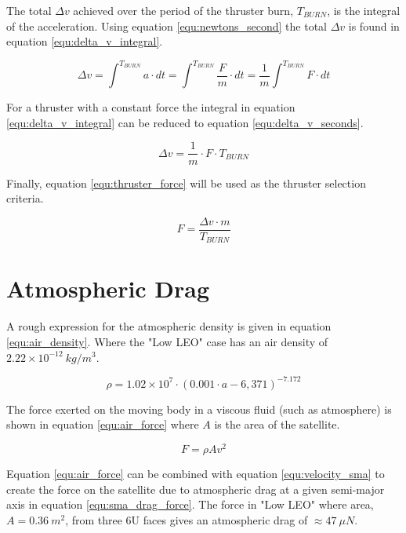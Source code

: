 \documentclass[a4paper, article, oneside, UKenglish]{memoir}
\newcommand{\0}{\mathbf{0}}
\newcommand{\1}{\mathbf{1}}
\begin{document}
The total $ \Delta v $ achieved over the period of the thruster burn, $T_{BURN}$, is the integral of the acceleration.  Using equation \ref{equ:newtons_second} the total $ \Delta v $ is found in equation \ref{equ:delta_v_integral}.

\begin{equation}
\Delta v = \int^{T_{BURN}} a \cdot dt = \int^{T_{BURN}} \frac{F}{m} \cdot dt = \frac{1}{m} \int^{T_{BURN}} F \cdot dt
\label{equ:delta_v_integral}
\end{equation}

For a thruster with a constant force the integral in equation \ref{equ:delta_v_integral} can be reduced to equation \ref{equ:delta_v_seconds}.

\begin{equation}
\Delta v =  \frac{1}{m} \cdot F \cdot T_{BURN}
\label{equ:delta_v_seconds}
\end{equation}

Finally, equation \ref{equ:thruster_force} will be used as the thruster selection criteria. 

\begin{equation}
F = \frac{\Delta v \cdot m}{T_{BURN}}
\label{equ:thruster_force}
\end{equation}



\chapter{Atmospheric Drag}

A rough expression for the atmospheric density is given in equation \ref{equ:air_density}.  Where the "Low LEO" case has an air density of $ 2.22 \times 10^{-12} ~ kg / m^3 $.

\begin{equation}
\rho = 1.02 \times 10^{7} \cdot {(0.001 \cdot a - 6,371)}^{-7.172}
\label{equ:air_density}
\end{equation}

The force exerted on the moving body in a viscous fluid (such as atmosphere) is shown in equation \ref{equ:air_force} where $A$ is the area of the satellite.

\begin{equation}
F = \rho A v^2
\label{equ:air_force}
\end{equation}

Equation \ref{equ:air_force} can be combined with equation \ref{equ:velocity_sma} to create the force on the satellite due to atmospheric drag at a given semi-major axis in equation \ref{equ:sma_drag_force}.  The force in "Low LEO" where area, $ A = 0.36 ~ m^2 $, from three 6U faces gives an atmospheric drag of $ \approx 47 ~ \mu N $.
\end{document}
